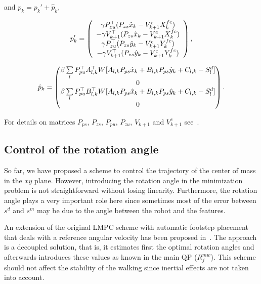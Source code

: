 and $p_k = p_k' + \hat{p}_k$,

{\scriptsize
\begin{equation*}
 p'_k = 
 \left(
 \begin{array}{c}
 \gamma P^{\top}_{zu}(P_{zs} \hat{x}_k - V_{k+1}^c X_k^{fc}) \\
 -\gamma V^{\top}_{k+1}(P_{zs}\hat{x}_k - V_{k+1}^c X_k^{fc}) \\
 \gamma P^{\top}_{zu}(P_{zs} \hat{y}_k - V_{k+1}^c Y_k^{fc}) \\
 -\gamma V^{\top}_{k+1}(P_{zs}\hat{y}_k - V_{k+1}^c Y_k^{fc})
 \end{array}
 \right),
\end{equation*}
}

{\scriptsize
\begin{equation*}
 \hat{p}_k = 
 \left(
 \begin{matrix}
 \beta  \sum\limits_l P_{pu}^{\top} A_{l,k}^{\top} W [A_{l,k} P_{ps} \hat{x}_k + B_{l,k} P_{ps} \hat{y}_k + C_{l,k} - S^d_l]\\
 0 \\
 \beta  \sum\limits_l P_{pu}^{\top} B_{l,k}^{\top} W [A_{l,k} P_{ps} \hat{x}_k + B_{l,k} P_{ps} \hat{y}_k + C_{l,k} - S^d_l ]\\
 0
 \end{matrix}
 \right).
\end{equation*}
}

For details on matrices $P_{ps}$, $P_{zs}$, $P_{pu}$, $P_{zu}$, $V_{k+1}$ and $V_{k+1}^c$ see~\cite{HerdtAR2010}.

\subsection{Control of the rotation angle}
\label{subsection:control_of_the_rotation_angle}
So far, we have proposed a scheme to control the trajectory of the center of mass in the $xy$ plane. However, introducing the rotation angle in the minimization problem is not straightforward without losing linearity. Furthermore, the rotation angle plays a very important role here since sometimes most of the error between $s^d$ and $s^m$ may be due to the angle between the robot and the features.

An extension of the original LMPC scheme with automatic footstep placement that deals with a reference angular velocity has been proposed in~\cite{HerdtIROS2010}. The approach is a decoupled solution, that is, it estimates first the optimal rotation angles and afterwards introduces these values as known in the main QP ($R^{mw}_j$).  This scheme should not affect the stability of the walking since inertial effects are not taken into account.

